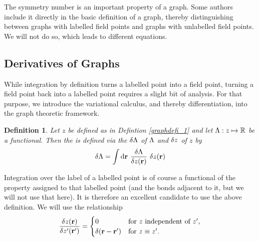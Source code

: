 \documentclass[8.5pt,twoside,twocolumn]{article}
\newcommand\di{\te{d}}
\newcommand\drr{\di\r\ }
\newcommand\zi{\enmat{z_i}}
\newcommand\zip{\enmat{z_{i'}}}
\renewcommand\r{\bo r}
\theoremstyle{standard}
\newtheorem{defi}[theo]{Definition}
\begin{document}
The symmetry number is an important property of a graph. Some authors include it
directly in the basic definition of a graph, thereby distinguishing between
graphs with labelled field points and graphs with unlabelled field points. We will
not do so, which leads to different equations. 

\subsection{Derivatives of Graphs}

While integration by definition turns a labelled point into a field point, turning
a field point back into a labelled point requires a slight bit of analysis. For that purpose,
we introduce the variational calculus, and thereby differentiation, into the graph theoretic framework.

\renewcommand\zi{z}
\renewcommand\zip{z'}
\begin{defi}
\label{funcderivative}
Let $\zi$ be defined as in Defintion \ref{graphdefi_1} and let $\La: \zi \mapsto \R$ be a functional.
Then the  \sdelti \La {\zi} is defined via the  $\delta\Lambda$ of $\Lambda$
and $\dl \zi$ of $\zi$ by
\begin{equation}
\dl\La = \int \drr \delti\La {\zi(\r)}\ \dl\zi(\r)
\label{FuncDeri}
\end{equation}
\end{defi}

Integration over the label of a labelled point is of course a functional of the property assigned
to that labelled point (and the bonds adjacent to it, but we will not use that
here). It is therefore an excellent candidate to use the above definition. We
will use the relationship
\begin{align}
\label{difrelation}
\delti{\zi(\r)}{\zip(\r')} =
\begin{cases}
0 & \te{for }\zi\te{ independent of }\zip,\\
\dl(\r - \r') & \te{for }\zi\equiv \zip.
\end{cases}
\end{align}
\end{document}
